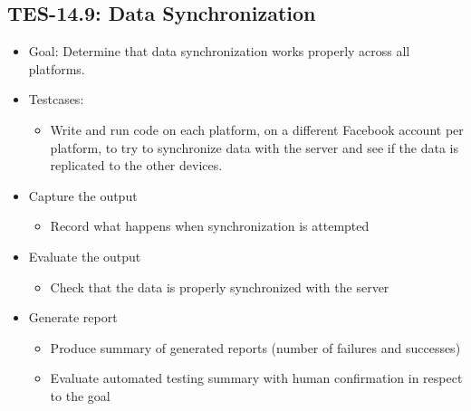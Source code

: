 \subsection{TES-14.9: Data Synchronization}
\label{subsec:sync}
\begin{itemize}
\item Goal: Determine that data synchronization works properly across 
all platforms.

\item Testcases: 
\begin{itemize}
\item Write and run code on each platform, on a different Facebook account 
per platform, to try to synchronize data with the server and see if the 
data is replicated to the other devices.
\end{itemize}

\item Capture the output 
\begin{itemize}
\item Record what happens when synchronization is attempted
\end{itemize}

\item Evaluate the output 
\begin{itemize}
\item Check that the data is properly synchronized with the server
\end{itemize}

\item Generate report 
\begin{itemize}
\item Produce summary of generated reports (number of failures and successes)
\item Evaluate automated testing summary with human confirmation in respect to the goal
\end{itemize}
\end{itemize}

